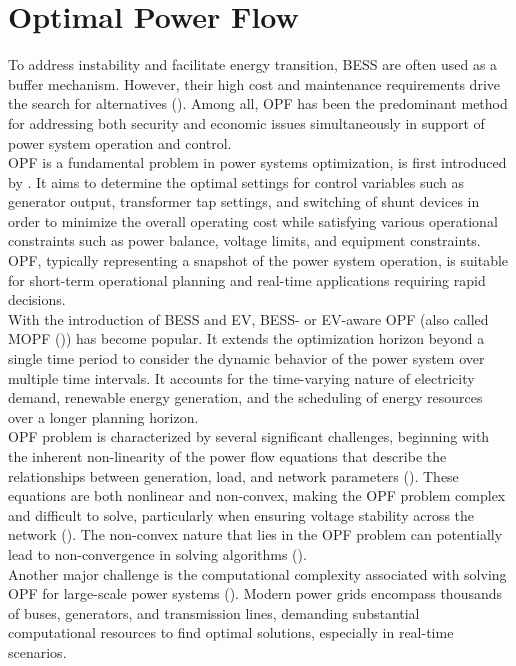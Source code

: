 \section{Optimal Power Flow}
To address instability and facilitate energy transition, \gls{BESS} are often used as a buffer mechanism. However, their high cost and maintenance requirements drive the search for alternatives (\cite{bessa2019handling,islam2019mitigating}). Among all, \gls{OPF} has been the predominant method for addressing both security and economic issues simultaneously in support of power system operation and control.\\
\gls{OPF} is a fundamental problem in power systems optimization, is first introduced by \cite{carpentier1962contribution}. It aims to determine the optimal settings for control variables such as generator output, transformer tap settings, and switching of shunt devices in order to minimize the overall operating cost while satisfying various operational constraints such as power balance, voltage limits, and equipment constraints. \gls{OPF}, typically representing a snapshot of the power system operation, is suitable for short-term operational planning and real-time applications requiring rapid decisions.\\
With the introduction of \gls{BESS} and \gls{EV}, \gls{BESS}- or \gls{EV}-aware \gls{OPF} (also called \gls{MOPF} (\cite{Kayacik2021}))  has become popular. It extends the optimization horizon beyond a single time period to consider the dynamic behavior of the power system over multiple time intervals. It accounts for the time-varying nature of electricity demand, renewable energy generation, and the scheduling of energy resources over a longer planning horizon.\\
\gls{OPF} problem is characterized by several significant challenges, beginning with the inherent non-linearity of the power flow equations that describe the relationships between generation, load, and network parameters (\cite{carpentier1962contribution}). These equations are both nonlinear and non-convex, making the \gls{OPF} problem complex and difficult to solve, particularly when ensuring voltage stability across the network (\cite{mei2008study, yang2017novel}). The non-convex nature that lies in the \gls{OPF} problem can potentially lead to non-convergence in solving algorithms (\cite{avriel2020nonlinear}).\\
Another major challenge is the computational complexity associated with solving \gls{OPF} for large-scale power systems (\cite{yang2016large}). Modern power grids encompass thousands of buses, generators, and transmission lines, demanding substantial computational resources to find optimal solutions, especially in real-time scenarios. \\
